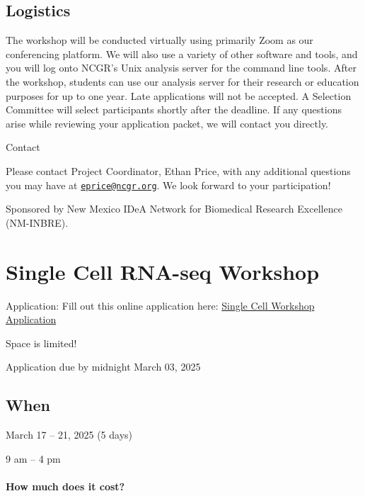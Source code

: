 \documentclass[
]{book}
\begin{document}
\hypertarget{logistics}{%
\section*{Logistics}\label{logistics}}

The workshop will be conducted virtually using primarily Zoom as our conferencing platform. We will also use a variety of other software and tools, and you will log onto NCGR's Unix analysis server for the command line tools. After the workshop, students can use our analysis server for their research or education purposes for up to one year. Late applications will not be accepted. A Selection Committee will select participants shortly after the deadline. If any questions arise while reviewing your application packet, we will contact you directly.

Contact

Please contact Project Coordinator, Ethan Price, with any additional questions you may have at \href{mailto:eprice@ncgr.org}{\nolinkurl{eprice@ncgr.org}}. We look forward to your participation!

Sponsored by New Mexico IDeA Network for Biomedical Research Excellence (NM-INBRE).

\hypertarget{single-cell-rna-seq-workshop}{%
\chapter*{Single Cell RNA-seq Workshop}\label{single-cell-rna-seq-workshop}}

Application: Fill out this online application here: \href{https://forms.gle/xcfJYaHSDr4SQYUw9}{Single Cell Workshop Application}

Space is limited!

Application due by midnight March 03, 2025

\hypertarget{when-3}{%
\section*{When}\label{when-3}}

March 17 -- 21, 2025 (5 days)

9 am -- 4 pm

\hypertarget{how-much-does-it-cost-3}{%
\subsubsection*{How much does it cost?}\label{how-much-does-it-cost-3}}
\end{document}
